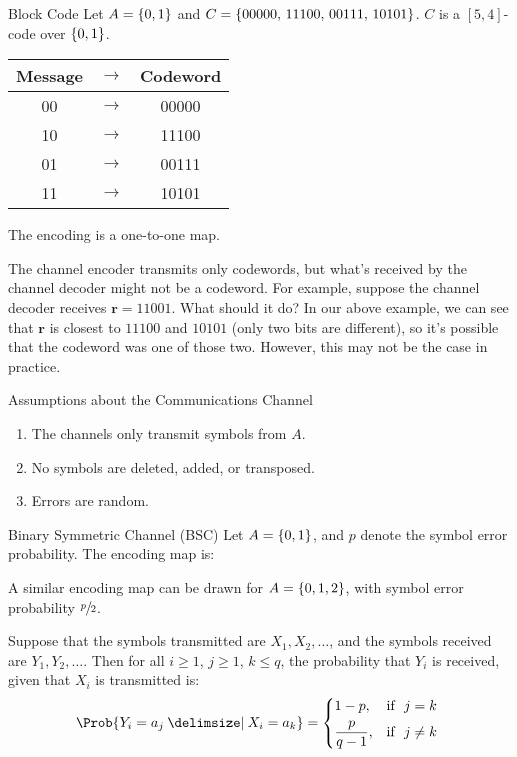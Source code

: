 \begin{Example}{Block Code}{}
    Let $ A=\{0,1\} $ and $ C=\{00000,\,11100,\,00111,\,10101\} $.
    $ C $ is a $ [5,4] $-code over $ \{0,1\} $.
    \begin{table}[H]
        \centering
        \begin{tabular}{@{}ccc@{}}
            Message & $ \rightarrow $ & Codeword \\
            \midrule
            00      & $ \rightarrow $ & 00000    \\
            10      & $ \rightarrow $ & 11100    \\
            01      & $ \rightarrow $ & 00111    \\
            11      & $ \rightarrow $ & 10101    \\
        \end{tabular}
    \end{table}
    The encoding is a one-to-one map.
\end{Example}

The channel encoder transmits only codewords, but what's received by the channel
decoder might not be a codeword. For example, suppose the channel decoder
receives $ \symbf{r}=11001 $. What should it do? In our above example, we can see
that $ \symbf{r} $ is closest to $ 11100 $ and $ 10101 $ (only two bits are different),
so it's possible that the codeword was one of those two. However,
this may not be the case in practice.

\begin{Definition}{Assumptions about the Communications Channel}{}
    \begin{enumerate}[label=(\Roman*)]
        \item The channels only transmit symbols from $ A $.
        \item No symbols are deleted, added, or transposed.
        \item Errors are random.
    \end{enumerate}
\end{Definition}

\begin{Example}{Binary Symmetric Channel (BSC)}{}
    Let $ A=\{0,1\} $, and $ p $ denote the symbol error probability.
    The encoding map is:
    \begin{center}
        
    \end{center}
    A similar encoding map can be drawn for $ A=\{0,1,2\} $,
    with symbol error probability $ \sfrac{p}{2} $.

    Suppose that the symbols transmitted are $ X_1,X_2,\ldots $,
    and the symbols received are $ Y_1,Y_2,\ldots $. Then for all
    $ i\geqslant 1 $, $ j\geqslant 1 $, $ k\leqslant q $, the probability
    that $ Y_i $ is received, given that $ X_i $ is transmitted is:
    \[ \Prob{Y_i=a_j\given X_i=a_k}=
        \begin{dcases*}
            1-p,           & \text{if } $ j=k $      \\
            \frac{p}{q-1}, & \text{if } $ j\neq{}k $
        \end{dcases*} \]
\end{Example}

